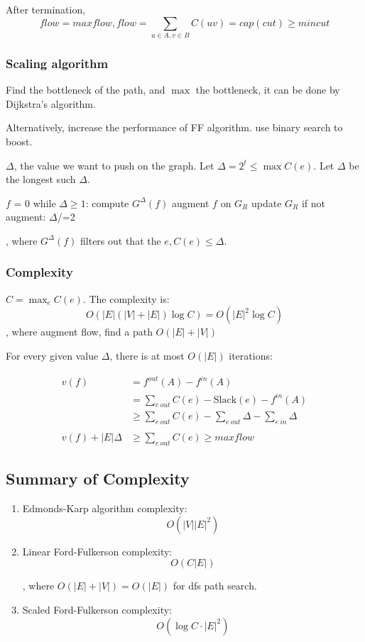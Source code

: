 \documentclass[a4paper]{report}
\theoremstyle{definition}
\begin{document}
After termination, 
$$
flow =maxflow , flow = \sum_{u\in A, v\in B}C(uv) = cap(cut) \geq mincut
$$

\subsubsection{Scaling algorithm}
Find the bottleneck of the path, and $\max$ the bottleneck, it can be done by Dijkstra's algorithm.

Alternatively, increase the performance of FF algorithm. use binary search to boost.

$\Delta$, the value we want to push on the graph. Let $\Delta=2^t \leq \max C(e)$. Let $\Delta$ be the longest such $\Delta$.
\begin{python}[mathescape]
$f$ = 0
while $\Delta\geq 1$:
  compute $G^\Delta(f)$
  augment $f$ on $G_R$
  update $G_R$
  if not augment:
    $\Delta$/=2
\end{python}
, where $G^\Delta(f)$ filters out that the $e, C(e)\leq \Delta$.
\subsubsection{Complexity}
$C = \max_{e}C(e)$. The complexity is:
$$
O(|E|(|V|+|E|)\log C) = O(|E|^2 \log C)
$$
, where augment flow, find a path $O(|E|+|V|)$

For every given value $\Delta$, there is at most $O(|E|)$ iterations:

\begin{align*}
v(f) &= f^{out}(A)-f^{in}(A) \\
&= \sum_{e~out}C(e)-\text{Slack}(e)-f^{in}(A) \\
&\geq \sum_{e~out}C(e)-\sum_{e~out}\Delta-\sum_{e~in}\Delta \\
\\
v(f)+|E|\Delta &\geq \sum_{e~out}C(e) \geq maxflow
\end{align*}

\subsection{Summary of Complexity}
\begin{enumerate}
\item Edmonds-Karp algorithm complexity:
$$
O(|V||E|^2)
$$
\item Linear Ford-Fulkerson complexity:
$$
O(C|E|)
$$

, where $O(|E|+|V|)=O(|E|)$ for dfs path search. 
\item Scaled Ford-Fulkerson complexity:
$$
O(\log C \cdot |E|^2)
$$
\end{enumerate}
\end{document}
